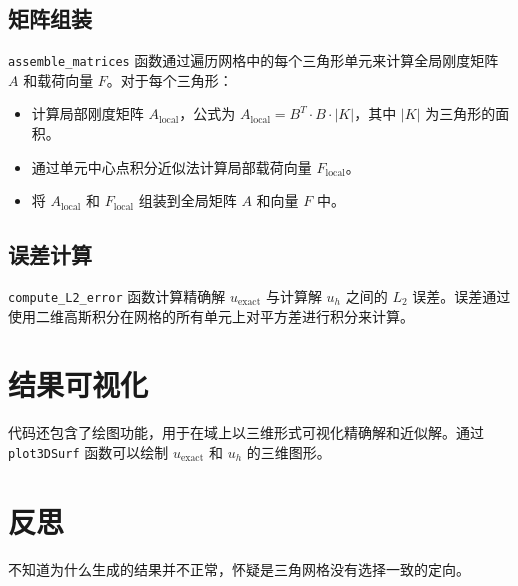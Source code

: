 \documentclass{article}
\begin{document}
\subsection{矩阵组装}
\texttt{assemble\_matrices} 函数通过遍历网格中的每个三角形单元来计算全局刚度矩阵 \( A \) 和载荷向量 \( F \)。对于每个三角形：
\begin{itemize}
    \item 计算局部刚度矩阵 \( A_{\text{local}} \)，公式为 \( A_{\text{local}} = B^T \cdot B \cdot |K| \)，其中 \( |K| \) 为三角形的面积。
    \item 通过单元中心点积分近似法计算局部载荷向量 \( F_{\text{local}} \)。
    \item 将 \( A_{\text{local}} \) 和 \( F_{\text{local}} \) 组装到全局矩阵 \( A \) 和向量 \( F \) 中。
\end{itemize}

\subsection{误差计算}
\texttt{compute\_L2\_error} 函数计算精确解 \( u_{\text{exact}} \) 与计算解 \( u_h \) 之间的 \( L_2 \) 误差。误差通过使用二维高斯积分在网格的所有单元上对平方差进行积分来计算。

\section{结果可视化}
代码还包含了绘图功能，用于在域上以三维形式可视化精确解和近似解。通过 \texttt{plot3DSurf} 函数可以绘制 \( u_{\text{exact}} \) 和 \( u_h \) 的三维图形。
\section{反思}
不知道为什么生成的结果并不正常，怀疑是三角网格没有选择一致的定向。
\end{document}
